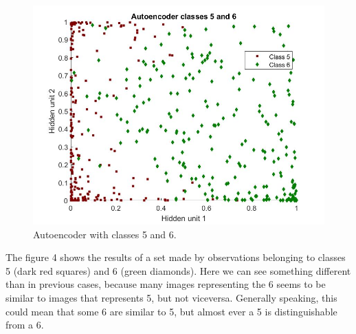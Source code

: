 \documentclass[10pt]{article}
\begin{document}
\begin{figure}[h] 
	\centering
	\includegraphics[width=0.9\columnwidth]{auto4.jpg} %
	\caption{Autoencoder with classes 5 and 6.}
\end{figure}
The figure 4 shows the results of a set made by observations belonging to classes 5 (dark red squares) and 6
(green diamonds). Here we can see something different than
in previous cases, because many images representing the 6
seems to be similar to images that represents 5, but not viceversa. Generally speaking, this could mean that some 6 are
similar to 5, but almost ever a 5 is distinguishable from a 6.
\end{document}
